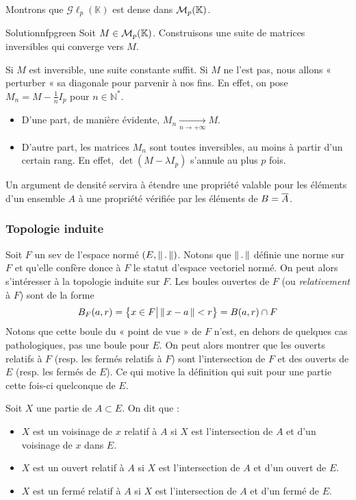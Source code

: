     \begin{exo}{}{}
        Montrons que $\mathcal{G}\ell_p(\mathbb{K})$ est dense dans $\mathcal{M}_{p}(\mathbb{K})$.
    \end{exo}

    \begin{demo}{Solution}{nfpgreen}
        Soit $M \in \mathcal{M}_{p}(\mathbb{K})$. Construisons une suite de matrices inversibles qui converge vers $M$.
         
        Si $M$ est inversible, une suite constante suffit. Si $M$ ne l’est pas, nous allons « perturber « sa diagonale pour parvenir à nos fins. En effet, on pose $M_n = M - \frac{1}{n} I_p$ pour $n \in \mathbb{N}^*$.
        \begin{itemize}
            \item D’une part, de manière évidente, $M_n \underset{n \rightarrow + \infty}{\longrightarrow} M$.
            \item D’autre part, les matrices $M_n$ sont toutes inversibles, au moins à partir d’un certain rang. En effet, $\det(M-\lambda I_p)$ s’annule au plus $p$ fois.
        \end{itemize}
    \end{demo}

    Un argument de densité servira à étendre une propriété valable pour les éléments d’un ensemble $A$ à une propriété vérifiée par les éléments de $B = \overline{A}$.

    \subsubsection{Topologie induite}

    Soit $F$ un sev de l’espace normé $(E, \left\lVert\,.\,\right\rVert)$. Notons que $\left\lVert\,.\,\right\rVert$ définie une norme sur $F$ et qu’elle confère donce à $F$ le statut d’espace vectoriel normé. On peut alors s’intéresser à la topologie induite sur $F$. Les boules ouvertes de $F$ (ou \textit{relativement} à $F$) sont de la forme 
    \[ B_F(a,r) = \big\{ x \in F \big| \left\lVert\,x - a\,\right\rVert < r \big\} = B(a,r) \cap F \] 
    Notons que cette boule du « point de vue » de $F$ n’est, en dehors de quelques cas pathologiques, pas une boule pour $E$. On peut alors montrer que les ouverts relatifs à $F$ (resp. les fermés relatifs à $F$) sont l’intersection de $F$ et des ouverts de $E$ (resp. les fermés de $E$). Ce qui motive la définition qui suit pour une partie cette fois-ci quelconque de $E$.

    \begin{defi}{}{}
        Soit $X$ une partie de $A \subset E$. On dit que : 
        \begin{itemize}
            \item $X$ est un voisinage de $x$ relatif à $A$ si $X$ est l’intersection de $A$ et d’un voisinage de $x$ dans $E$.
            \item $X$ est un ouvert relatif à $A$ si $X$ est l’intersection de $A$ et d’un ouvert de $E$.
            \item $X$ est un fermé relatif à $A$ si $X$ est l’intersection de $A$ et d’un fermé de $E$.
        \end{itemize}
    \end{defi}

